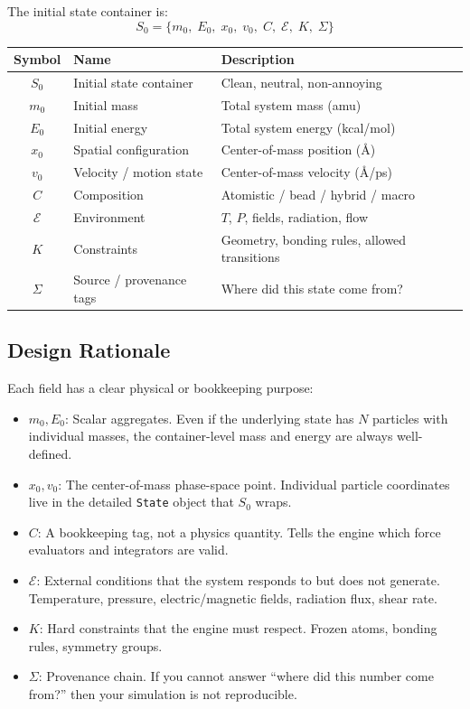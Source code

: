 \documentclass[11pt]{article}
\begin{document}
The initial state container is:
\begin{equation}
S_0 = \{m_0, \; E_0, \; x_0, \; v_0, \; C, \; \mathcal{E}, \; K, \; \Sigma\}
\end{equation}

\begin{center}
\begin{tabular}{clp{8cm}}
\toprule
\textbf{Symbol} & \textbf{Name} & \textbf{Description} \\
\midrule
$S_0$ & Initial state container & Clean, neutral, non-annoying \\
$m_0$ & Initial mass & Total system mass (amu) \\
$E_0$ & Initial energy & Total system energy (kcal/mol) \\
$x_0$ & Spatial configuration & Center-of-mass position (\AA) \\
$v_0$ & Velocity / motion state & Center-of-mass velocity (\AA/ps) \\
$C$ & Composition & Atomistic / bead / hybrid / macro \\
$\mathcal{E}$ & Environment & $T$, $P$, fields, radiation, flow \\
$K$ & Constraints & Geometry, bonding rules, allowed transitions \\
$\Sigma$ & Source / provenance tags & Where did this state come from? \\
\bottomrule
\end{tabular}
\end{center}

\subsection{Design Rationale}

Each field has a clear physical or bookkeeping purpose:

\begin{itemize}
  \item \textbf{$m_0, E_0$}: Scalar aggregates. Even if the underlying state has $N$ particles with individual masses, the container-level mass and energy are always well-defined.
  \item \textbf{$x_0, v_0$}: The center-of-mass phase-space point. Individual particle coordinates live in the detailed \texttt{State} object that $S_0$ wraps.
  \item \textbf{$C$}: A bookkeeping tag, not a physics quantity. Tells the engine which force evaluators and integrators are valid.
  \item \textbf{$\mathcal{E}$}: External conditions that the system responds to but does not generate. Temperature, pressure, electric/magnetic fields, radiation flux, shear rate.
  \item \textbf{$K$}: Hard constraints that the engine must respect. Frozen atoms, bonding rules, symmetry groups.
  \item \textbf{$\Sigma$}: Provenance chain. If you cannot answer ``where did this number come from?'' then your simulation is not reproducible.
\end{itemize}
\end{document}

